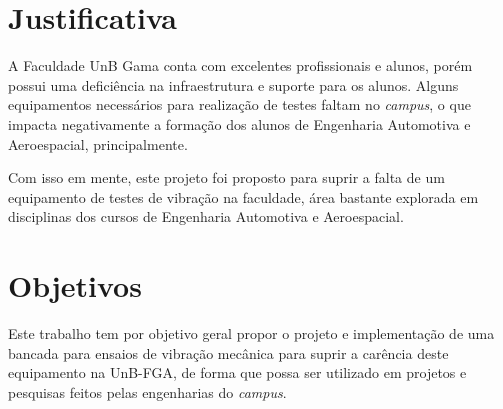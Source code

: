 \section{Justificativa}
    A Faculdade UnB Gama conta com excelentes profissionais e alunos, porém possui uma deficiência na infraestrutura e suporte para os alunos. Alguns equipamentos
    necessários para realização de testes faltam no \textit{campus}, o que
    impacta negativamente a formação dos alunos de Engenharia
    Automotiva e Aeroespacial, principalmente.

    Com isso em mente, este projeto foi proposto para suprir a falta de
    um equipamento de testes de vibração na faculdade, área bastante explorada
    em disciplinas dos cursos de Engenharia Automotiva e Aeroespacial.

\section{Objetivos}


    Este trabalho tem por objetivo geral propor o projeto e implementação de uma bancada para ensaios de vibração mecânica para suprir a carência deste equipamento na UnB-FGA, de forma que possa ser utilizado em projetos e pesquisas feitos pelas engenharias do \textit{campus}.


